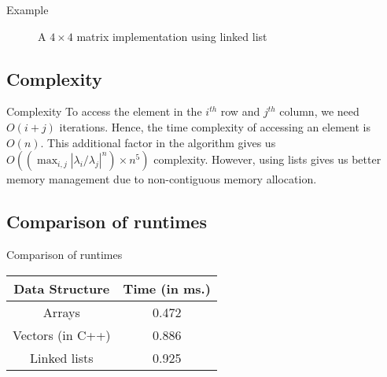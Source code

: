 \begin{frame}{Example}
    \begin{figure}[h!]
    	\begin{center}
    		\resizebox{\columnwidth/2}{!}{}
    	\end{center}
    	\caption{A $4 \times 4$ matrix implementation using linked list}
    	\label{fig:fig5}
    \end{figure}
\end{frame}

\subsection{Complexity}
\begin{frame}{Complexity}
    To access the element in the $i^{th}$ row and $j^{th}$ column, we need $O(i + j)$ iterations. Hence, the time complexity of accessing an element is $O(n)$. This additional factor in the algorithm gives us $O((\max_{i, j} |\lambda_i / \lambda_j| ^ n) \times n ^ 5)$ complexity. However, using lists gives us better memory management due to non-contiguous memory allocation.
\end{frame}

\subsection{Comparison of runtimes}
\begin{frame}{Comparison of runtimes}
    \centering
    \begin{tabular}{| c | c |}
         \hline
         \textbf{Data Structure} &  \textbf{Time (in ms.)}\\
         \hline
         Arrays & 0.472 \\ 
         \hline
         Vectors (in C++) & 0.886 \\
         \hline
         Linked lists & 0.925 \\
         \hline
    \end{tabular}
\end{frame}
